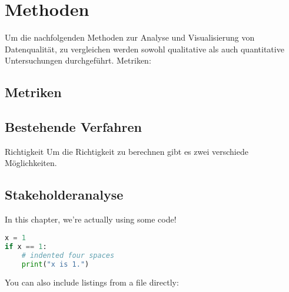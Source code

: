 \chapter{Methoden}\label{ch:method}
Um die nachfolgenden Methoden zur Analyse und Visualisierung von Datenqualität, zu vergleichen werden sowohl qualitative als auch quantitative Untersuchungen durchgeführt.
Metriken:


\section{Metriken}

\section{Bestehende Verfahren}
Richtigkeit
Um die Richtigkeit zu berechnen gibt es zwei verschiede Möglichkeiten. 


\section{Stakeholderanalyse}



In this chapter, we're actually using some code!

\begin{lstlisting}[language=Python,caption={This is an example of inline listing},captionpos=b]
x = 1
if x == 1:
    # indented four spaces
    print("x is 1.")

\end{lstlisting}

You can also include listings from a file directly:


